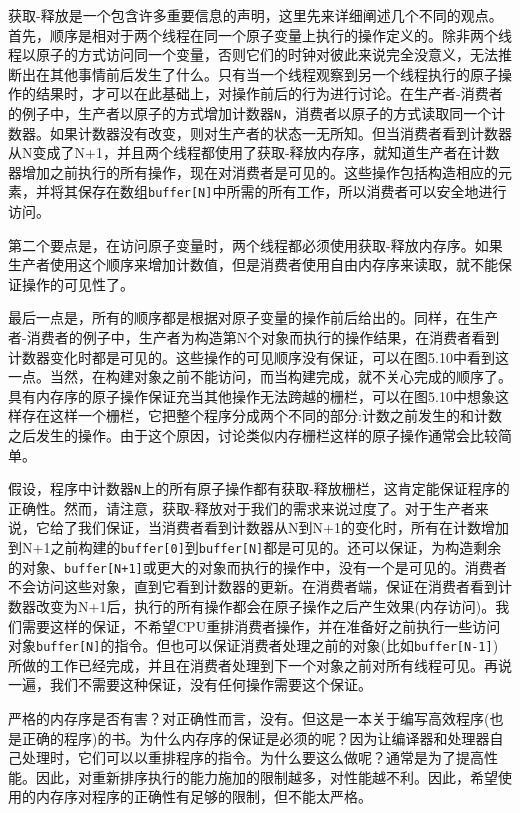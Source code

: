 获取-释放是一个包含许多重要信息的声明，这里先来详细阐述几个不同的观点。首先，顺序是相对于两个线程在同一个原子变量上执行的操作定义的。除非两个线程以原子的方式访问同一个变量，否则它们的时钟对彼此来说完全没意义，无法推断出在其他事情前后发生了什么。只有当一个线程观察到另一个线程执行的原子操作的结果时，才可以在此基础上，对操作前后的行为进行讨论。在生产者-消费者的例子中，生产者以原子的方式增加计数器\texttt{N}，消费者以原子的方式读取同一个计数器。如果计数器没有改变，则对生产者的状态一无所知。但当消费者看到计数器从N变成了N+1，并且两个线程都使用了获取-释放内存序，就知道生产者在计数器增加之前执行的所有操作，现在对消费者是可见的。这些操作包括构造相应的元素，并将其保存在数组\texttt{buffer[N]}中所需的所有工作，所以消费者可以安全地进行访问。

第二个要点是，在访问原子变量时，两个线程都必须使用获取-释放内存序。如果生产者使用这个顺序来增加计数值，但是消费者使用自由内存序来读取，就不能保证操作的可见性了。

最后一点是，所有的顺序都是根据对原子变量的操作前后给出的。同样，在生产者-消费者的例子中，生产者为构造第N个对象而执行的操作结果，在消费者看到计数器变化时都是可见的。这些操作的可见顺序没有保证，可以在图5.10中看到这一点。当然，在构建对象之前不能访问，而当构建完成，就不关心完成的顺序了。具有内存序的原子操作保证充当其他操作无法跨越的栅栏，可以在图5.10中想象这样存在这样一个栅栏，它把整个程序分成两个不同的部分:计数之前发生的和计数之后发生的操作。由于这个原因，讨论类似内存栅栏这样的原子操作通常会比较简单。

假设，程序中计数器\texttt{N}上的所有原子操作都有获取-释放栅栏，这肯定能保证程序的正确性。然而，请注意，获取-释放对于我们的需求来说过度了。对于生产者来说，它给了我们保证，当消费者看到计数器从N到N+1的变化时，所有在计数增加到N+1之前构建的\texttt{buffer[0]}到\texttt{buffer[N]}都是可见的。还可以保证，为构造剩余的对象、\texttt{buffer[N+1]}或更大的对象而执行的操作中，没有一个是可见的。消费者不会访问这些对象，直到它看到计数器的更新。在消费者端，保证在消费者看到计数器改变为N+1后，执行的所有操作都会在原子操作之后产生效果(内存访问)。我们需要这样的保证，不希望CPU重排消费者操作，并在准备好之前执行一些访问对象\texttt{buffer[N]}的指令。但也可以保证消费者处理之前的对象(比如\texttt{buffer[N-1]})所做的工作已经完成，并且在消费者处理到下一个对象之前对所有线程可见。再说一遍，我们不需要这种保证，没有任何操作需要这个保证。

严格的内存序是否有害？对正确性而言，没有。但这是一本关于编写高效程序(也是正确的程序)的书。为什么内存序的保证是必须的呢？因为让编译器和处理器自己处理时，它们可以以重排程序的指令。为什么要这么做呢？通常是为了提高性能。因此，对重新排序执行的能力施加的限制越多，对性能越不利。因此，希望使用的内存序对程序的正确性有足够的限制，但不能太严格。

